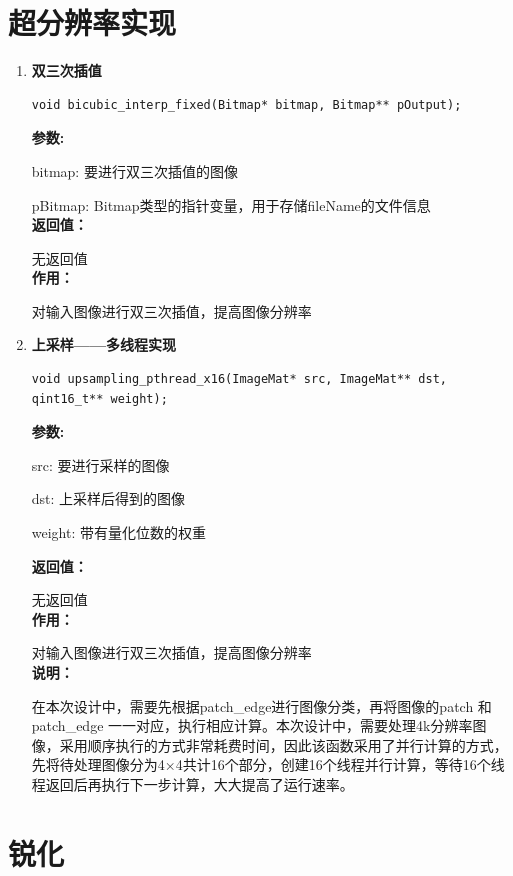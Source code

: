 \documentclass[12pt, a4paper, oneside]{ctexbook}
\begin{document}
	\section{超分辨率实现}
	\begin{enumerate}
		\item \textbf{双三次插值}
		\begin{lstlisting}[numbers=none]
void bicubic_interp_fixed(Bitmap* bitmap, Bitmap** pOutput);
		\end{lstlisting}
		\textbf{参数:} \par bitmap: 要进行双三次插值的图像 \par pBitmap: Bitmap类型的指针变量，用于存储fileName的文件信息 \\
		\textbf{返回值：}\par 无返回值\\
		\textbf{作用：}\par 对输入图像进行双三次插值，提高图像分辨率\\
	
	\item \textbf{上采样——多线程实现}
		\begin{lstlisting}[numbers=none]
void upsampling_pthread_x16(ImageMat* src, ImageMat** dst, qint16_t** weight);			
		\end{lstlisting}
		\textbf{参数:} \par src: 要进行采样的图像 \par dst: 上采样后得到的图像\par weight: 带有量化位数的权重\par
		\textbf{返回值：}\par 无返回值\\
		\textbf{作用：}\par 对输入图像进行双三次插值，提高图像分辨率\\
		\textbf{说明：}\par 在本次设计中，需要先根据patch\_edge进行图像分类，再将图像的patch 和 patch\_edge 一一对应，执行相应计算。本次设计中，需要处理4k分辨率图像，采用顺序执行的方式非常耗费时间，因此该函数采用了并行计算的方式，先将待处理图像分为4×4共计16个部分，创建16个线程并行计算，等待16个线程返回后再执行下一步计算，大大提高了运行速率。

		
	\end{enumerate}
	

		
	\section{锐化}
\end{document}
